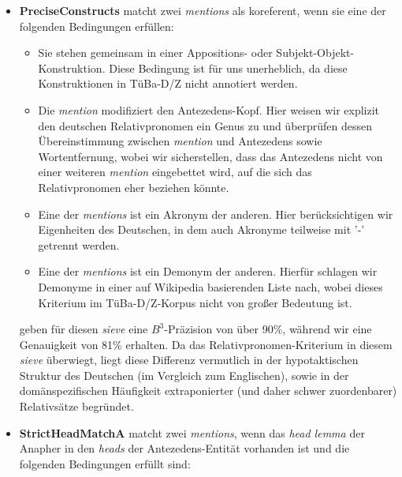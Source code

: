 \documentclass{scrartcl}
\begin{document}
\begin{itemize}
\item \textbf{PreciseConstructs} matcht zwei \textit{mentions} als koreferent, wenn sie eine der folgenden Bedingungen erfüllen: 
\begin{itemize}
	\item Sie stehen gemeinsam in einer Appositions- oder Subjekt-Objekt-Konstruktion. Diese Bedingung ist für uns unerheblich, da diese Konstruktionen in TüBa-D/Z nicht annotiert werden.
	\item Die \textit{mention} modifiziert den Antezedens-Kopf. Hier weisen wir explizit den deutschen Relativpronomen ein Genus zu und überprüfen dessen Übereinstimmung zwischen \textit{mention} und Antezedens sowie Wortentfernung, wobei wir sicherstellen, dass das Antezedens nicht von einer weiteren \textit{mention} eingebettet wird, auf die sich das Relativpronomen eher beziehen könnte.
	\item Eine der \textit{mentions} ist ein Akronym der anderen. Hier berücksichtigen wir Eigenheiten des Deutschen, in dem auch Akronyme teilweise mit '-' getrennt werden.
	\item Eine der \textit{mentions} ist ein Demonym der anderen. Hierfür schlagen wir Demonyme in einer auf Wikipedia basierenden Liste nach, wobei dieses Kriterium im TüBa-D/Z-Korpus nicht von großer Bedeutung ist.
\end{itemize}
 geben für diesen \textit{sieve} eine $B^3$-Präzision von über 90\%, während wir eine Genauigkeit von 81\% erhalten. Da das Relativpronomen-Kriterium in diesem \textit{sieve} überwiegt, liegt diese Differenz vermutlich in der hypotaktischen Struktur des Deutschen (im Vergleich zum Englischen), sowie in der domänspezifischen Häufigkeit extraponierter (und daher schwer zuordenbarer) Relativsätze begründet.

\item \textbf{StrictHeadMatchA} matcht zwei \textit{mentions}, wenn das \textit{head lemma} der Anapher in den \textit{heads} der Antezedens-Entität vorhanden ist und die folgenden Bedingungen erfüllt sind:



\end{itemize}
\end{document}
